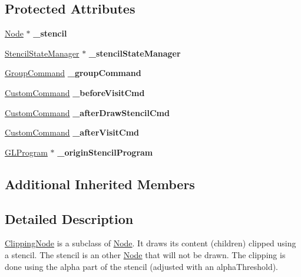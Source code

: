 \subsection*{Protected Attributes}
\begin{DoxyCompactItemize}
\item 
\mbox{\label{classClippingNode_adca3753e907589c9a60f537ed3e99b10}} 
\hyperlink{classNode}{Node} $\ast$ {\bfseries \+\_\+stencil}
\item 
\mbox{\label{classClippingNode_a3d54e37d9954521acc57426fb067b123}} 
\hyperlink{classStencilStateManager}{Stencil\+State\+Manager} $\ast$ {\bfseries \+\_\+stencil\+State\+Manager}
\item 
\mbox{\label{classClippingNode_a89c9ca0def0f22bb0f5a4fcb5ba3ac13}} 
\hyperlink{classGroupCommand}{Group\+Command} {\bfseries \+\_\+group\+Command}
\item 
\mbox{\label{classClippingNode_af692f1e0a91cff0c84b6d76f372aa590}} 
\hyperlink{classCustomCommand}{Custom\+Command} {\bfseries \+\_\+before\+Visit\+Cmd}
\item 
\mbox{\label{classClippingNode_a4075448c2c2ff70991c6013c00fa73e4}} 
\hyperlink{classCustomCommand}{Custom\+Command} {\bfseries \+\_\+after\+Draw\+Stencil\+Cmd}
\item 
\mbox{\label{classClippingNode_ac8b48ab6ada4d789872879d8dd97ec6d}} 
\hyperlink{classCustomCommand}{Custom\+Command} {\bfseries \+\_\+after\+Visit\+Cmd}
\item 
\mbox{\label{classClippingNode_a644bea73efe9f52190d062a8174833ce}} 
\hyperlink{classGLProgram}{G\+L\+Program} $\ast$ {\bfseries \+\_\+origin\+Stencil\+Program}
\end{DoxyCompactItemize}
\subsection*{Additional Inherited Members}


\subsection{Detailed Description}
\hyperlink{classClippingNode}{Clipping\+Node} is a subclass of \hyperlink{classNode}{Node}. It draws its content (children) clipped using a stencil. The stencil is an other \hyperlink{classNode}{Node} that will not be drawn. The clipping is done using the alpha part of the stencil (adjusted with an alpha\+Threshold). 


